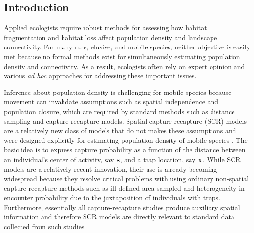 \documentclass[12pt]{article}
\begin{document}
\begin{spacing}{1.8}
\section{Introduction}

Applied ecologists require robust methods
for assessing how habitat fragmentation and habitat loss affect
population density and landscape connectivity. For many rare, elusive,
and mobile species, neither objective is easily met because no formal
methods exist for simultaneously estimating population
density and connectivity. As a result, ecologists often rely on expert
opinion and various \textit{ad hoc} approaches for addressing these
important issues.

Inference about population density is challenging for mobile species
because movement can invalidate assumptions such as spatial
independence and population closure, which are required by standard
methods such as distance sampling and capture-recapture models.
Spatial capture-recapture (SCR) models are a relatively new class of
models that do not makes these assumptions and were
designed explicitly for estimating population density of mobile
species
\citep{efford:2004,borchers_efford:2008, royle_young:2008, efford_etal:2009ecol,
  royle_etal:2009ecol}.
The basic idea is to express capture %
probability %
as a function of the distance between an individual's center of
activity, say ${\bf s}$, and a trap location, say ${\bf x}$.
While SCR models are a relatively recent innovation, their use is
already becoming widespread \citep{efford_etal:2009ecol,
  gardner_etal:2010jwm, gardner_etal:2010ecol,kery_etal:2010,
  gopalaswamy_etal:2012, foster_harmsen:2012} because they resolve
critical problems with using ordinary non-spatial capture-recapture
methods such as ill-defined area sampled and heterogeneity in
encounter probability due to the juxtaposition of individuals with
traps.
Furthermore, essentially all capture-recapture
studies produce auxiliary spatial information and therefore SCR models
are directly relevant to standard data collected from such studies.


\end{spacing}
\end{document}
